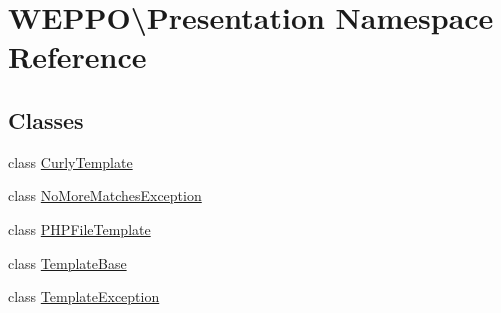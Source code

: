 \hypertarget{namespaceWEPPO_1_1Presentation}{}\section{W\+E\+P\+PO\textbackslash{}Presentation Namespace Reference}
\label{namespaceWEPPO_1_1Presentation}
\subsection*{Classes}
\begin{DoxyCompactItemize}
\item 
class \hyperlink{classWEPPO_1_1Presentation_1_1CurlyTemplate}{Curly\+Template}
\item 
class \hyperlink{classWEPPO_1_1Presentation_1_1NoMoreMatchesException}{No\+More\+Matches\+Exception}
\item 
class \hyperlink{classWEPPO_1_1Presentation_1_1PHPFileTemplate}{P\+H\+P\+File\+Template}
\item 
class \hyperlink{classWEPPO_1_1Presentation_1_1TemplateBase}{Template\+Base}
\item 
class \hyperlink{classWEPPO_1_1Presentation_1_1TemplateException}{Template\+Exception}
\end{DoxyCompactItemize}
